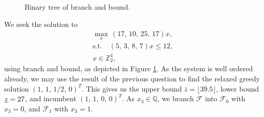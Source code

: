 \documentclass[11pt,a4paper]{article}
\begin{document}
\begin{enumerate}[i)]
\begin{figure}[tbp]
        \caption{Binary tree of branch and bound.}
        \label{fig:bnb}
    \end{figure}
    We seek the solution to
    \begin{gather*}
        \max_x \, (17, \, 10, \, 25, \, 17) x, \\
        \text{s.t.} \quad (5, \, 3, \, 8, \, 7) x \leq 12, \\
        x \in \mathbb{Z}_2^4,
    \end{gather*}
    using branch and bound, as depicted in Figure \ref{fig:bnb}. As the system is well ordered already, we may use the result of the previous question to find the relaxed greedy solution $(1, \, 1, \, 1/2, \, 0)^T$. This gives us the upper bound $\bar{z} = \lfloor 39.5 \rfloor$, lower bound $\underbar{$z$} = 27$, and incumbent $(1, \, 1, \, 0, \, 0)^T$. As $x_3 \in \mathbb{Q}$, we branch $\mathcal{F}$ into $\mathcal{F}_0$ with $x_3 = 0$, and $\mathcal{F}_1$ with $x_3 = 1$.


\end{enumerate}
\end{document}
